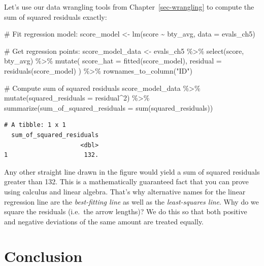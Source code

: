\documentclass[
  letterpaper,
  DIV=11,
  numbers=noendperiod]{scrreprt}
\newenvironment{Shaded}{\begin{snugshade}}{\end{snugshade}}
\newcommand{\AttributeTok}[1]{\textcolor[rgb]{0.40,0.45,0.13}{#1}}
\newcommand{\CommentTok}[1]{\textcolor[rgb]{0.37,0.37,0.37}{#1}}
\newcommand{\DecValTok}[1]{\textcolor[rgb]{0.68,0.00,0.00}{#1}}
\newcommand{\FunctionTok}[1]{\textcolor[rgb]{0.28,0.35,0.67}{#1}}
\newcommand{\NormalTok}[1]{\textcolor[rgb]{0.00,0.23,0.31}{#1}}
\newcommand{\OtherTok}[1]{\textcolor[rgb]{0.00,0.23,0.31}{#1}}
\newcommand{\SpecialCharTok}[1]{\textcolor[rgb]{0.37,0.37,0.37}{#1}}
\newcommand{\StringTok}[1]{\textcolor[rgb]{0.13,0.47,0.30}{#1}}
\theoremstyle{definition}
\theoremstyle{remark}
\begin{document}
Let's use our data wrangling tools from Chapter~\ref{sec-wrangling} to
compute the sum of squared residuals exactly:

\begin{Shaded}
\begin{Highlighting}[]
\CommentTok{\# Fit regression model:}
\NormalTok{score\_model }\OtherTok{\textless{}{-}} \FunctionTok{lm}\NormalTok{(score }\SpecialCharTok{\textasciitilde{}}\NormalTok{ bty\_avg, }\AttributeTok{data =}\NormalTok{ evals\_ch5)}

\CommentTok{\# Get regression points:}
\NormalTok{score\_model\_data }\OtherTok{\textless{}{-}}\NormalTok{ evals\_ch5 }\SpecialCharTok{\%\textgreater{}\%} 
  \FunctionTok{select}\NormalTok{(score, bty\_avg) }\SpecialCharTok{\%\textgreater{}\%} 
  \FunctionTok{mutate}\NormalTok{(}
    \AttributeTok{score\_hat =} \FunctionTok{fitted}\NormalTok{(score\_model),}
    \AttributeTok{residual =} \FunctionTok{residuals}\NormalTok{(score\_model)}
\NormalTok{    ) }\SpecialCharTok{\%\textgreater{}\%} 
  \FunctionTok{rownames\_to\_column}\NormalTok{(}\StringTok{"ID"}\NormalTok{)}

\CommentTok{\# Compute sum of squared residuals}
\NormalTok{score\_model\_data }\SpecialCharTok{\%\textgreater{}\%}
  \FunctionTok{mutate}\NormalTok{(}\AttributeTok{squared\_residuals =}\NormalTok{ residual}\SpecialCharTok{\^{}}\DecValTok{2}\NormalTok{) }\SpecialCharTok{\%\textgreater{}\%}
  \FunctionTok{summarize}\NormalTok{(}\AttributeTok{sum\_of\_squared\_residuals =} \FunctionTok{sum}\NormalTok{(squared\_residuals))}
\end{Highlighting}
\end{Shaded}

\begin{verbatim}
# A tibble: 1 x 1
  sum_of_squared_residuals
                     <dbl>
1                     132.
\end{verbatim}

Any other straight line drawn in the figure would yield a sum of squared
residuals greater than 132. This is a mathematically guaranteed fact
that you can prove using calculus and linear algebra. That's why
alternative names for the linear regression line are the
\emph{best-fitting line} as well as the \emph{least-squares line}. Why
do we square the residuals (i.e.~the arrow lengths)? We do this so that
both positive and negative deviations of the same amount are treated
equally.

\hypertarget{sec-basic-reg-conclusion}{%
\section{Conclusion}\label{sec-basic-reg-conclusion}}
\end{document}

